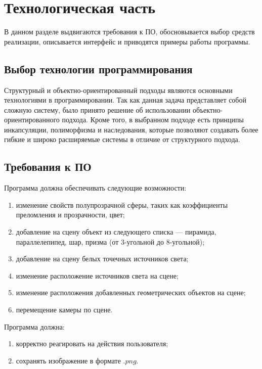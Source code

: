\section{Технологическая часть}
В данном разделе выдвигаются требования к ПО, обосновывается выбор средств реализации, описывается интерфейс и приводятся примеры работы программы.

\subsection{Выбор технологии программирования}
Структурный и объектно-ориентированный подходы являются основными технологиями в программировании. Так как данная задача представляет собой сложную систему, было принято решение об использовании объектно-ориентированного подхода. Кроме того, в выбранном подходе есть принципы инкапсуляции, полиморфизма и наследования, которые позволяют создавать более гибкие и широко расширяемые системы в отличие от структурного подхода.

\subsection{Требования к ПО}
Программа должна обеспечивать следующие возможности:
\begin{enumerate}
	\item изменение свойств полупрозрачной сферы, таких как коэффициенты преломления и прозрачности, цвет;
	\item добавление на сцену объект из следующего списка --- пирамида, параллелепипед, шар, призма (от 3-угольной до 8-угольной);
	\item добавление на сцену белых точечных источников света;
	\item изменение расположение источников света на сцене;
	\item изменение расположения добавленных геометрических объектов на сцене;
	\item перемещение камеры по сцене.
\end{enumerate}


Программа должна:
\begin{enumerate}
	\item корректно реагировать на действия пользователя;
	\item сохранять изображение в формате $.png$.
\end{enumerate}

